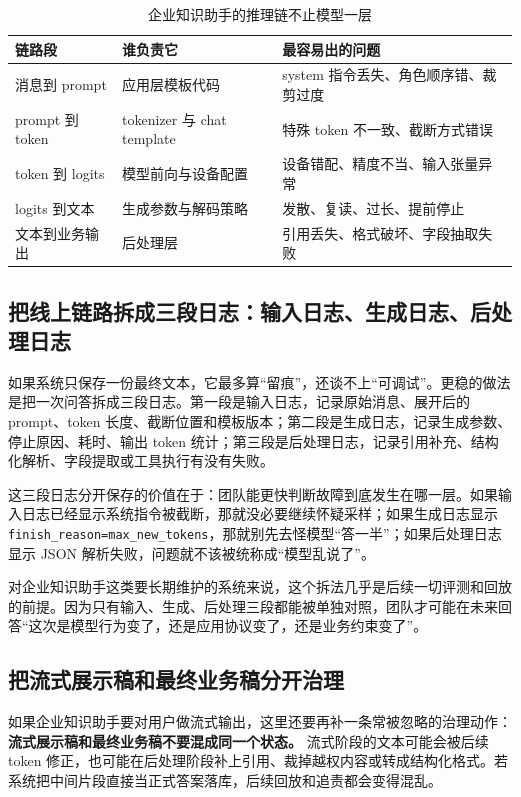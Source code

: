 \begin{table}[H]
\centering
\small
\begin{tabularx}{\textwidth}{>{\raggedright\arraybackslash}p{2.8cm}>{\raggedright\arraybackslash}p{3.4cm}>{\raggedright\arraybackslash}X}
\toprule
\textbf{链路段} & \textbf{谁负责它} & \textbf{最容易出的问题} \\
\midrule
消息到 prompt & 应用层模板代码 & system 指令丢失、角色顺序错、裁剪过度 \\
prompt 到 token & tokenizer 与 chat template & 特殊 token 不一致、截断方式错误 \\
token 到 logits & 模型前向与设备配置 & 设备错配、精度不当、输入张量异常 \\
logits 到文本 & 生成参数与解码策略 & 发散、复读、过长、提前停止 \\
文本到业务输出 & 后处理层 & 引用丢失、格式破坏、字段抽取失败 \\
\bottomrule
\end{tabularx}
\caption{企业知识助手的推理链不止模型一层}
\label{tab:inference-responsibility}
\end{table}

\subsection{把线上链路拆成三段日志：输入日志、生成日志、后处理日志}
如果系统只保存一份最终文本，它最多算“留痕”，还谈不上“可调试”。更稳的做法是把一次问答拆成三段日志。第一段是输入日志，记录原始消息、展开后的 prompt、token 长度、截断位置和模板版本；第二段是生成日志，记录生成参数、停止原因、耗时、输出 token 统计；第三段是后处理日志，记录引用补充、结构化解析、字段提取或工具执行有没有失败。

这三段日志分开保存的价值在于：团队能更快判断故障到底发生在哪一层。如果输入日志已经显示系统指令被截断，那就没必要继续怀疑采样；如果生成日志显示 \texttt{finish\_reason=max\_new\_tokens}，那就别先去怪模型“答一半”；如果后处理日志显示 JSON 解析失败，问题就不该被统称成“模型乱说了”。

对企业知识助手这类要长期维护的系统来说，这个拆法几乎是后续一切评测和回放的前提。因为只有输入、生成、后处理三段都能被单独对照，团队才可能在未来回答“这次是模型行为变了，还是应用协议变了，还是业务约束变了”。

\subsection{把流式展示稿和最终业务稿分开治理}
如果企业知识助手要对用户做流式输出，这里还要再补一条常被忽略的治理动作：\textbf{流式展示稿和最终业务稿不要混成同一个状态。} 流式阶段的文本可能会被后续 token 修正，也可能在后处理阶段补上引用、裁掉越权内容或转成结构化格式。若系统把中间片段直接当正式答案落库，后续回放和追责都会变得混乱。

